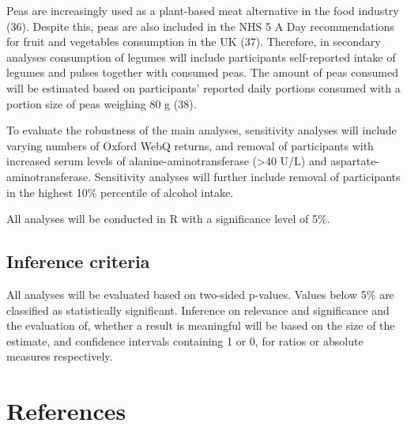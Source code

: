 \documentclass[
  11pt,
  a4paper,
  DIV=11,
  numbers=noendperiod,
  twocolumn]{scrartcl}
\begin{document}
Peas are increasingly used as a plant-based meat alternative in the food
industry (36). Despite this, peas are also included in the NHS 5 A Day
recommendations for fruit and vegetables consumption in the UK (37).
Therefore, in secondary analyses consumption of legumes will include
participants self-reported intake of legumes and pulses together with
consumed peas. The amount of peas consumed will be estimated based on
participants' reported daily portions consumed with a portion size of
peas weighing 80 g (38).

To evaluate the robustness of the main analyses, sensitivity analyses
will include varying numbers of Oxford WebQ returns, and removal of
participants with increased serum levels of alanine-aminotransferase
(\textgreater40 U/L) and aspartate-aminotransferase. Sensitivity
analyses will further include removal of participants in the highest
10\% percentile of alcohol intake.

All analyses will be conducted in R with a significance level of 5\%.

\hypertarget{inference-criteria}{%
\subsection{Inference criteria}\label{inference-criteria}}

All analyses will be evaluated based on two-sided p-values. Values below
5\% are classified as statistically significant. Inference on relevance
and significance and the evaluation of, whether a result is meaningful
will be based on the size of the estimate, and confidence intervals
containing 1 or 0, for ratios or absolute measures respectively.

\hypertarget{references}{%
\section*{References}\label{references}}
\end{document}
